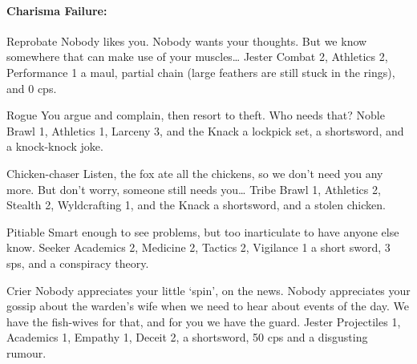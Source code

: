\begin{multicols}{2}
\begin{itemize}
\end{itemize}

\paragraph{Charisma Failure:}

\begin{itemize}

  {Reprobate}%
  {Nobody likes you.
  Nobody wants your thoughts.
  But we know somewhere that can make use of your muscles\ldots
  }%
  {Jester}%
  {Combat 2, Athletics 2, Performance 1}%
  {a maul, partial chain (large feathers are still stuck in the rings), and 0 \glspl{cp}.}%

  {Rogue}%
  {You argue and complain, then resort to theft.
  Who needs that?
  }%
  {Noble}%
  {Brawl 1, Athletics 1, Larceny 3, and the Knack \lucky}%
  {a lockpick set, a shortsword, and a knock-knock joke.}%

  {Chicken-chaser}%
  {Listen, the fox ate all the chickens, so we don't need you any more.
  But don't worry, someone still needs you\ldots
  }%
  {Tribe}%
  {Brawl 1, Athletics 2, Stealth 2, Wyldcrafting 1, and the Knack \lucky}%
  {a shortsword, and a stolen chicken.}%

  {Pitiable}%
  {Smart enough to see problems, but too inarticulate to have anyone else know.
  }%
  {Seeker}%
  {Academics 2, Medicine 2, Tactics 2, Vigilance 1}%
  {a short sword, 3 \glspl{sp}, and a conspiracy theory.}%

  {Crier}%
  {Nobody appreciates your little `spin', on the news.
  Nobody appreciates your gossip about the warden's wife when we need to hear about events of the day.
  We have the fish-wives for that, and for you we have the \gls{guard}.
  }%
  {Jester}%
  {Projectiles 1, Academics 1, Empathy 1, Deceit 2, }%
  {a shortsword, 50 \glspl{cp} and a disgusting rumour.}%


\end{itemize}


\end{multicols}
